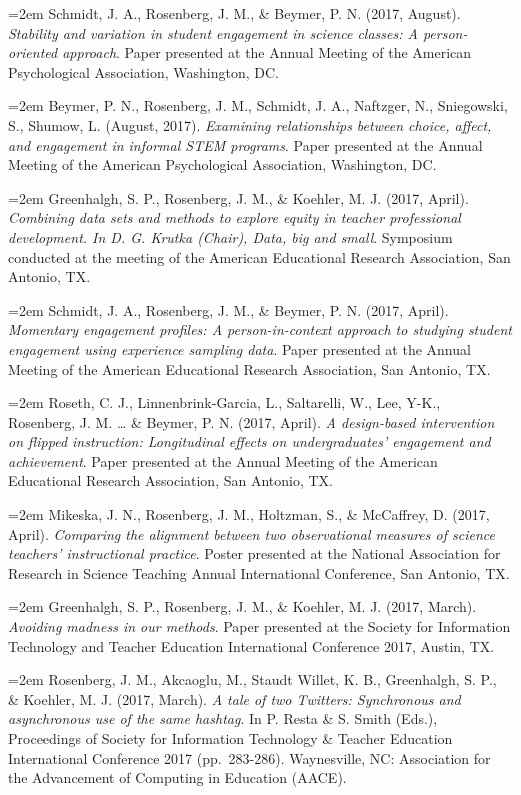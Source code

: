 \documentclass[
  14,
]{article}
\begin{document}
\hangindent=2em Schmidt, J. A., Rosenberg, J. M., \& Beymer, P. N.
(2017, August). \emph{Stability and variation in student engagement in
science classes: A person-oriented approach}. Paper presented at the
Annual Meeting of the American Psychological Association, Washington,
DC.

\hangindent=2em Beymer, P. N., Rosenberg, J. M., Schmidt, J. A.,
Naftzger, N., Sniegowski, S., Shumow, L. (August, 2017). \emph{Examining
relationships between choice, affect, and engagement in informal STEM
programs}. Paper presented at the Annual Meeting of the American
Psychological Association, Washington, DC.

\hangindent=2em Greenhalgh, S. P., Rosenberg, J. M., \& Koehler, M. J.
(2017, April). \emph{Combining data sets and methods to explore equity
in teacher professional development. In D. G. Krutka (Chair), Data, big
and small}. Symposium conducted at the meeting of the American
Educational Research Association, San Antonio, TX.

\hangindent=2em Schmidt, J. A., Rosenberg, J. M., \& Beymer, P. N.
(2017, April). \emph{Momentary engagement profiles: A person-in-context
approach to studying student engagement using experience sampling data}.
Paper presented at the Annual Meeting of the American Educational
Research Association, San Antonio, TX.

\hangindent=2em Roseth, C. J., Linnenbrink-Garcia, L., Saltarelli, W.,
Lee, Y-K., Rosenberg, J. M. \ldots{} \& Beymer, P. N. (2017, April).
\emph{A design-based intervention on flipped instruction: Longitudinal
effects on undergraduates' engagement and achievement}. Paper presented
at the Annual Meeting of the American Educational Research Association,
San Antonio, TX.

\hangindent=2em Mikeska, J. N., Rosenberg, J. M., Holtzman, S., \&
McCaffrey, D. (2017, April). \emph{Comparing the alignment between two
observational measures of science teachers' instructional practice}.
Poster presented at the National Association for Research in Science
Teaching Annual International Conference, San Antonio, TX.

\hangindent=2em Greenhalgh, S. P., Rosenberg, J. M., \& Koehler, M. J.
(2017, March). \emph{Avoiding madness in our methods}. Paper presented
at the Society for Information Technology and Teacher Education
International Conference 2017, Austin, TX.

\hangindent=2em Rosenberg, J. M., Akcaoglu, M., Staudt Willet, K. B.,
Greenhalgh, S. P., \& Koehler, M. J. (2017, March). \emph{A tale of two
Twitters: Synchronous and asynchronous use of the same hashtag}. In P.
Resta \& S. Smith (Eds.), Proceedings of Society for Information
Technology \& Teacher Education International Conference 2017
(pp.~283-286). Waynesville, NC: Association for the Advancement of
Computing in Education (AACE).
\end{document}
